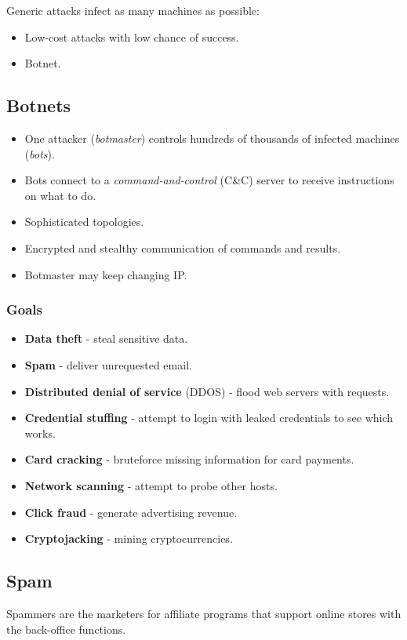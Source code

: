 \documentclass[11pt]{article}
\begin{document}
Generic attacks infect as many machines as possible:
\begin{itemize}
  \item Low-cost attacks with low chance of success.
  \item Botnet.
\end{itemize}

\subsection{Botnets}
\begin{itemize}
  \item One attacker (\textit{botmaster}) controls hundreds of thousands of infected machines (\textit{bots}).
  \item Bots connect to a \textit{command-and-control} (C\&C) server to receive instructions on what to do.
  \item Sophisticated topologies.
  \item Encrypted and stealthy communication of commands and results.
  \item Botmaster may keep changing IP.
\end{itemize}

\subsubsection{Goals}
\begin{itemize}
  \item \textbf{Data theft} - steal sensitive data.
  \item \textbf{Spam} - deliver unrequested email.
  \item \textbf{Distributed denial of service} (DDOS) - flood web servers with requests.
  \item \textbf{Credential stuffing} - attempt to login with leaked credentials to see which works.
  \item \textbf{Card cracking} - bruteforce missing information for card payments.
  \item \textbf{Network scanning} - attempt to probe other hosts.
  \item \textbf{Click fraud} - generate advertising revenue.
  \item \textbf{Cryptojacking} - mining cryptocurrencies.
\end{itemize}

\subsection{Spam}
Spammers are the marketers for affiliate programs that support online stores with the back-office functions.
\end{document}
